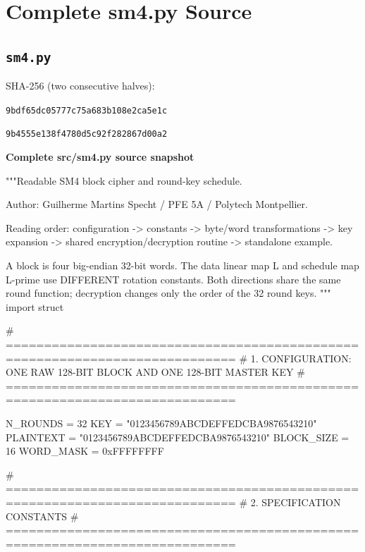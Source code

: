 \ifnum{}\relax\else\appendix\fi
\chapter{Complete sm4.py Source}
\section{\texttt{sm4.py}}\label{source:sm4}
\noindent SHA-256 (two consecutive halves):\par
\texttt{9bdf65dc05777c75a683b108e2ca5e1c}\par
\texttt{9b4555e138f4780d5c92f282867d00a2}\par
\par\smallskip\noindent\textbf{Complete src/sm4.py source snapshot}\par
\begin{lightcode}[numbers=left,firstnumber=1]
"""Readable SM4 block cipher and round-key schedule.

Author: Guilherme Martins Specht / PFE 5A / Polytech Montpellier.

Reading order: configuration -> constants -> byte/word transformations -> key
expansion -> shared encryption/decryption routine -> standalone example.

A block is four big-endian 32-bit words. The data linear map L and schedule map
L-prime use DIFFERENT rotation constants. Both directions share the same round
function; decryption changes only the order of the 32 round keys.
"""
import struct

# ============================================================================
# 1. CONFIGURATION: ONE RAW 128-BIT BLOCK AND ONE 128-BIT MASTER KEY
# ============================================================================

N_ROUNDS = 32
KEY = "0123456789ABCDEFFEDCBA9876543210"
PLAINTEXT = "0123456789ABCDEFFEDCBA9876543210"
BLOCK_SIZE = 16
WORD_MASK = 0xFFFFFFFF

# ============================================================================
# 2. SPECIFICATION CONSTANTS
# ============================================================================


\end{lightcode}

